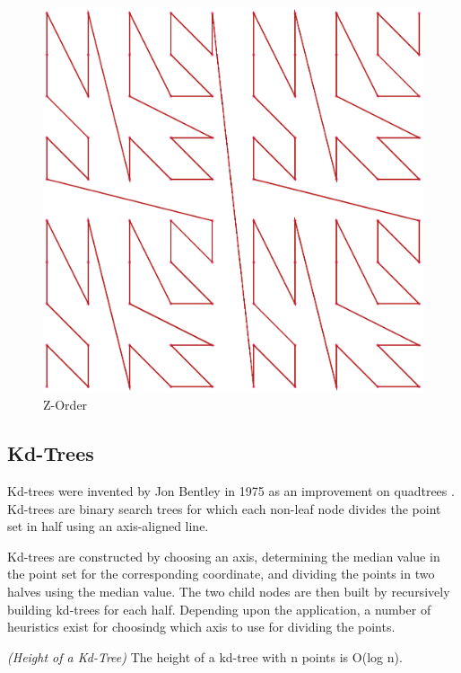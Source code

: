 \documentclass[mcs]{scsthesis}
\begin{document}
\begin{figure}
\begin{center}
\includegraphics[scale=0.4]{diagrams/zorder.eps}
\caption{Z-Order}
\end{center}
\end{figure}


\subsection{Kd-Trees}

Kd-trees were invented by Jon Bentley in 1975 as an improvement on quadtrees
\cite{bentley}.  Kd-trees are binary search trees for which each non-leaf node
divides the point set in half using an axis-aligned line.

Kd-trees are constructed by choosing an axis, determining the median value in
the point set for the corresponding coordinate, and dividing the points in two
halves using the median value.  The two child nodes are then built by
recursively building kd-trees for each half.  Depending upon the application,
a number of heuristics exist for choosindg which axis to use for dividing the
points.

\begin{thm} \emph{(Height of a Kd-Tree)}
The height of a kd-tree with n points is O(log n).
\end{thm}
\end{document}
